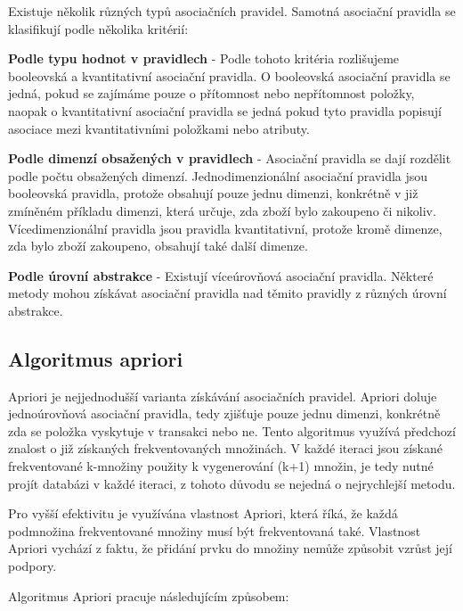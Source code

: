 Existuje několik různých typů asociačních pravidel. Samotná asociační pravidla se klasifikují podle několika kritérií: \cite[Kapitola~6]{Kamber}

\textbf{Podle typu hodnot v pravidlech} - Podle tohoto kritéria rozlišujeme booleovská a kvantitativní asociační pravidla. O booleovská asociační pravidla se jedná, pokud se zajímáme pouze o přítomnost nebo nepřítomnost položky, naopak o kvantitativní asociační pravidla se jedná pokud tyto pravidla popisují asociace mezi kvantitativními položkami nebo atributy. \cite[Kapitola~6]{Kamber} 

\textbf{Podle dimenzí obsažených v pravidlech} - Asociační pravidla se dají rozdělit podle počtu obsažených dimenzí. Jednodimenzionální asociační pravidla jsou booleovská pravidla, protože obsahují pouze jednu dimenzi, konkrétně v již zmíněném příkladu dimenzi, která určuje, zda zboží bylo zakoupeno či nikoliv. Vícedimenzionální pravidla jsou pravidla kvantitativní, protože kromě dimenze, zda bylo zboží zakoupeno, obsahují také další dimenze.

\textbf{Podle úrovní abstrakce} - Existují víceúrovňová asociační pravidla. Některé metody mohou získávat asociační pravidla nad těmito pravidly z různých úrovní abstrakce. \cite[Kapitola~6]{Kamber}

\subsection{Algoritmus apriori}


Apriori je nejjednodušší varianta získávání asociačních pravidel. Apriori doluje jednoúrovňová asociační pravidla, tedy zjišťuje pouze jednu dimenzi, konkrétně zda se položka vyskytuje v transakci nebo ne.
Tento algoritmus využívá předchozí znalost o již získaných frekventovaných množinách. V každé iteraci jsou získané frekventované k-množiny použity k vygenerování (k+1) množin, je tedy nutné projít databázi v každé iteraci, z tohoto důvodu se nejedná o nejrychlejší metodu.

Pro vyšší efektivitu je využívána vlastnost Apriori, která říká, že každá podmnožina frekventované množiny musí být frekventovaná také. Vlastnost Apriori vychází z faktu, že přidání prvku do množiny nemůže způsobit vzrůst její podpory. \cite[Kapitola~6]{Kamber}

Algoritmus Apriori pracuje následujícím způsobem: \cite[Kapitola~6]{Kamber}


